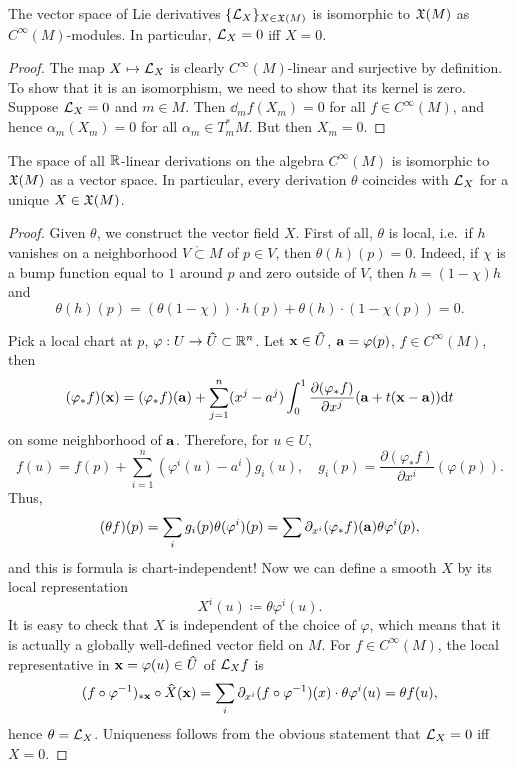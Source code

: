 \begin{prop}\label{prop 2.2.9 Marsden}
    The vector space of Lie derivatives $\{\Lie_X\}_{X\in\fX(M)}$ is isomorphic to $\fX(M)$ as $C^\infty(M)$-modules. In particular, $\Lie_X=0$ iff $X=0$.
\end{prop}
\begin{proof}
    The map $X\mapsto \calL_X$ is clearly $C^\infty(M)$-linear and surjective by definition. To show that it is an isomorphism, we need to show that its kernel is zero. Suppose $\calL_X=0$ and $m\in M$. Then $\dd_m f(X_m)=0$ for all $f\in C^\infty(M)$, and hence $\alpha_m(X_m)=0$ for all $\alpha_m\in T_m^\ast M$. But then $X_m=0$.
\end{proof}
\begin{prop}\label{lie derivatives and vector fields}
The space of all $\bbR $-linear derivations on the algebra $C^\infty(M)$ is isomorphic to $\fX(M)$ as a vector space. In particular, every derivation $\theta$ coincides with $\Lie_X$ for a unique $X\in\fX(M)$.
\end{prop}
\begin{proof}
    Given $\theta$, we construct the vector field $X$.
    First of all, $\theta$ is local, i.e.\ if $h$ vanishes on a neighborhood $V\mathring{\subset} M$ of $p\in V$, then $\theta(h)(p)=0$. Indeed, if $\chi$ is a bump function equal to $1$ around $p$ and zero outside of $V$, then $h=(1-\chi)h$ and
    \[\theta(h)(p)=(\theta(1-\chi))\cdot h(p)+\theta(h)\cdot (1-\chi(p))=0.\]

    Pick a local chart at $p$, $\varphi:U\to\wh{U}\subset\bbR^n$. Let $\bf{x}\in\wh{U}$, $\bf{a}=\varphi(p)$, $f\in C^\infty(M)$, then 
    \[(\varphi_\ast f)(\bf{x})=(\varphi_\ast f)(\bf{a})+\sum_{j=1}^n (x^j-a^j)\int_0^1 \frac{\partial(\varphi_\ast f)}{\partial x^j} (\bf{a}+t(\bf{x}-\bf{a}))\dd t\]
    on some neighborhood of $\bf{a}$.
    Therefore, for $u\in U$,
    \[f(u)=f(p)+\sum_{i=1}^n (\varphi^i(u)-a^i)g_i(u),\quad g_i(p)=\frac{\partial(\varphi_\ast f)}{\partial x^i} (\varphi(p)).\] 
    Thus,
    \[(\theta f)(p)=\sum_i g_i(p)\theta(\varphi^i)(p)=\sum \partial_{x^i}(\varphi_\ast f)(\bf{a}) \theta \varphi^i(p),\]
    and this is formula is chart-independent! Now we can define a smooth $X$ by its local representation
    \[X^i(u)\coloneqq \theta\varphi^i(u).\]
    It is easy to check that $X$ is independent of the choice of $\varphi$, which means that it is actually a globally well-defined vector field on $M$. For $f\in C^\infty(M)$, the local representative in $\bf{x}=\varphi(u)\in\wh{U}$ of $\Lie_X f$ is 
    \[(f\circ\varphi^{-1})_{\ast \bf{x}}\circ \wh{X}(\bf{x})=\sum_i \partial_{x^i}(f\circ \varphi^{-1})(x)\cdot \theta \varphi^i (u)=\theta f(u),\]
    hence $\theta=\Lie_X$.
    Uniqueness follows from the obvious statement that $\Lie_X=0$ iff $X=0$.
\end{proof}
